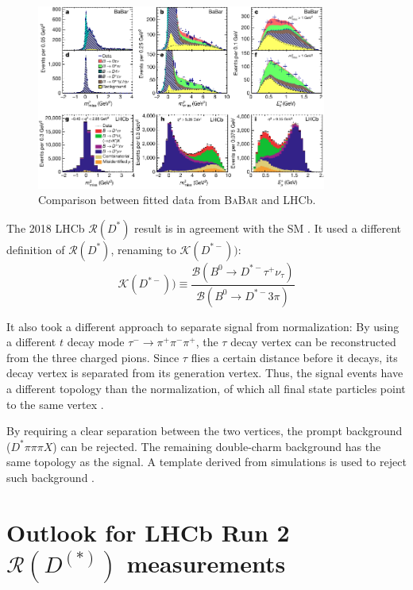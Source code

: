 \documentclass[12pt,letterpaper]{article}
\newcommand{\PRLrule}{
    \bigskip
    \noindent\makebox[\linewidth]{
        \resizebox{0.3333\linewidth}{1pt}{$\blacklozenge$}
    }
    \bigskip
}
\def\BaBar/{\textsc{BaBar}}
\def\RDst/{\ensuremath{\mathcal{R}(D^{*})}}
\def\RDDst/{\ensuremath{\mathcal{R}(D^{(*)})}}
\begin{document}
\begin{figure}[ht]
    \centering
    \includegraphics[width=0.85\textwidth]{figs/babar_lhcb_fit_comparison.pdf}
    \caption{
        Comparison between fitted data from \BaBar/ and LHCb.
    }
    \label{fig:babar_lhcb_fit_comparison}
\end{figure}

The 2018 LHCb \RDst/ result is in agreement with the SM \cite{Aaij:2017deq}.
It used a different definition of \RDst/, renaming to $\mathcal{K}(D^{*-}))$:
\begin{equation}
    \mathcal{K}(D^{*-})) \equiv \frac{
        \mathcal{B}(B^0 \rightarrow D^{*-} \tau^+ \nu_\tau)
    }{
        \mathcal{B}(B^0 \rightarrow D^{*-} 3 \pi)
    }
\end{equation}

It also took a different approach to separate signal from normalization:
By using a different $t$ decay mode $\tau^- \rightarrow \pi^+ \pi^- \pi^+$,
the $\tau$ decay vertex can be reconstructed from the three charged pions.
Since $\tau$ flies a certain distance before it decays, its decay vertex is
separated from its generation vertex.
Thus, the signal events have a different topology than the normalization, of
which all final state particles point to the same vertex \cite{Aaij:2017deq}.

By requiring a clear separation between the two vertices, the prompt background
($D^* \pi \pi \pi X$) can be rejected.
The remaining double-charm background has the same topology as the signal.
A template derived from simulations is used to reject such
background \cite{Aaij:2017deq}.

\section{Outlook for LHCb Run 2 \RDDst/ measurements}



\PRLrule
\printbibliography
\end{document}
